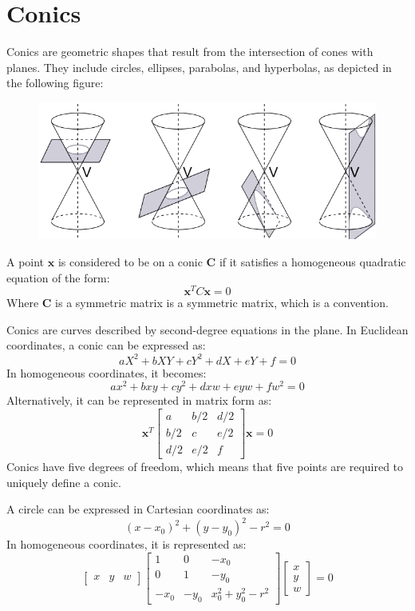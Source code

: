 \section{Conics}

Conics are geometric shapes that result from the intersection of cones with planes. 
They include circles, ellipses, parabolas, and hyperbolas, as depicted in the following figure:
\begin{figure}[H]
    \centering
    \includegraphics[width=0.5\linewidth]{images/conics.png}
\end{figure}
\begin{definition}
    A point $\mathbf{x}$ is considered to be on a conic $\mathbf{C}$ if it satisfies a homogeneous quadratic equation of the form:
    \[\mathbf{x}^TC\mathbf{x}=0\]
    Where $\mathbf{C}$ is a symmetric matrix is a symmetric matrix, which is a convention.
\end{definition}
Conics are curves described by second-degree equations in the plane. 
In Euclidean coordinates, a conic can be expressed as:
\[aX^2+bXY+cY^2+dX+eY+f=0\]
In homogeneous coordinates, it becomes:
\[ax^2+bxy+cy^2+dxw+eyw+fw^2=0\]
Alternatively, it can be represented in matrix form as:
\[\mathbf{x}^T \begin{bmatrix} a & b/2 & d/2 \\ b/2 & c & e/2 \\ d/2 & e/2 & f \end{bmatrix} \mathbf{x}=0\]
Conics have five degrees of freedom, which means that five points are required to uniquely define a conic.
\begin{example}
    A circle can be expressed in Cartesian coordinates as:
    \[(x-x_0)^2+(y-y_0)^2-r^2=0\]
    In homogeneous coordinates, it is represented as:
    \[\begin{bmatrix} x & y & w \end{bmatrix} \begin{bmatrix} 1 & 0 & -x_0 \\ 0 & 1 & -y_0 \\ -x_0 & -y_0 & x_0^2+y_0^2-r^2 \end{bmatrix} \begin{bmatrix} x \\ y \\ w \end{bmatrix} = 0\]
\end{example}

